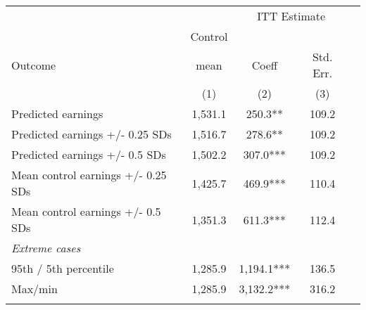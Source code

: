 \begin{tabular}{lcccc}
\hline \noalign{\smallskip} &  & \multicolumn{2}{c}{{ ITT Estimate}} & \\
\cline{3-4} & Control &  &  & \\
Outcome & mean & Coeff & Std. Err. & \\
 & (1) & (2) & (3) & \\
\noalign{\smallskip}\hline \noalign{\smallskip}Predicted earnings & 1,531.1 & 250.3** & 109.2 & \\
Predicted earnings +/- 0.25 SDs & 1,516.7 & 278.6** & 109.2 & \\
Predicted earnings +/- 0.5 SDs & 1,502.2 & 307.0*** & 109.2 & \\
Mean control earnings +/- 0.25 SDs & 1,425.7 & 469.9*** & 110.4 & \\
Mean control earnings +/- 0.5 SDs & 1,351.3 & 611.3*** & 112.4 & \\
\hline 
\emph{Extreme cases}   & &  & & \\
95th / 5th percentile & 1,285.9 & 1,194.1*** & 136.5 & \\
Max/min & 1,285.9 & 3,132.2*** & 316.2 & \\
\noalign{\smallskip}\hline\end{tabular}\\

